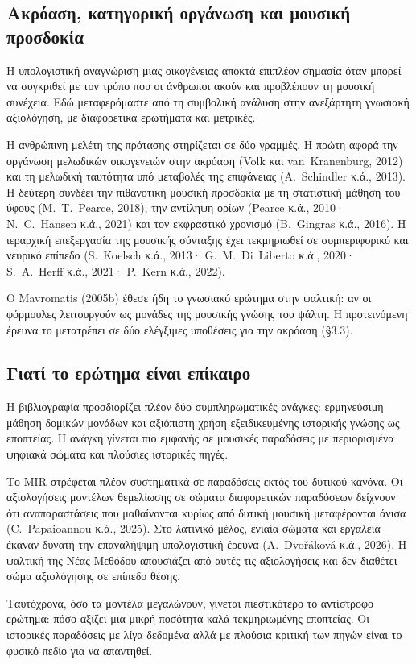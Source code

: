 \documentclass[11pt,a4paper]{article}
\begin{document}
\subsection{Ακρόαση, κατηγορική οργάνωση και μουσική προσδοκία}
Η υπολογιστική αναγνώριση μιας οικογένειας αποκτά επιπλέον σημασία όταν μπορεί να συγκριθεί με τον τρόπο που οι άνθρωποι ακούν και προβλέπουν τη μουσική συνέχεια. Εδώ μεταφερόμαστε από τη συμβολική ανάλυση στην ανεξάρτητη γνωσιακή αξιολόγηση, με διαφορετικά ερωτήματα και μετρικές.

Η ανθρώπινη μελέτη της πρότασης στηρίζεται σε δύο γραμμές. Η πρώτη αφορά την οργάνωση μελωδικών οικογενειών στην ακρόαση (Volk και van~Kranenburg, 2012) και τη μελωδική ταυτότητα υπό μεταβολές της επιφάνειας (A.~Schindler κ.ά., 2013). Η δεύτερη συνδέει την πιθανοτική μουσική προσδοκία με τη στατιστική μάθηση του ύφους (M.~T.~Pearce, 2018), την αντίληψη ορίων (Pearce κ.ά., 2010· N.~C.~Hansen κ.ά., 2021) και τον εκφραστικό χρονισμό (B.~Gingras κ.ά., 2016). Η ιεραρχική επεξεργασία της μουσικής σύνταξης έχει τεκμηριωθεί σε συμπεριφορικό και νευρικό επίπεδο (S.~Koelsch κ.ά., 2013· G.~M.~Di~Liberto κ.ά., 2020· S.~A.~Herff κ.ά., 2021· P.~Kern κ.ά., 2022).

Ο Mavromatis (2005b) έθεσε ήδη το γνωσιακό ερώτημα στην ψαλτική: αν οι φόρμουλες λειτουργούν ως μονάδες της μουσικής γνώσης του ψάλτη. Η προτεινόμενη έρευνα το μετατρέπει σε δύο ελέγξιμες υποθέσεις για την ακρόαση (§3.3).

\subsection{Γιατί το ερώτημα είναι επίκαιρο}
Η βιβλιογραφία προσδιορίζει πλέον δύο συμπληρωματικές ανάγκες: ερμηνεύσιμη μάθηση δομικών μονάδων και αξιόπιστη χρήση εξειδικευμένης ιστορικής γνώσης ως εποπτείας. Η ανάγκη γίνεται πιο εμφανής σε μουσικές παραδόσεις με περιορισμένα ψηφιακά σώματα και πλούσιες ιστορικές πηγές.

Το MIR στρέφεται πλέον συστηματικά σε παραδόσεις εκτός του δυτικού κανόνα. Οι αξιολογήσεις μοντέλων θεμελίωσης σε σώματα διαφορετικών παραδόσεων δείχνουν ότι αναπαραστάσεις που μαθαίνονται κυρίως από δυτική μουσική μεταφέρονται άνισα (C.~Papaioannou κ.ά., 2025). Στο λατινικό μέλος, ενιαία σώματα και εργαλεία έκαναν δυνατή την επαναλήψιμη υπολογιστική έρευνα (A.~Dvořáková κ.ά., 2026). Η ψαλτική της Νέας Μεθόδου απουσιάζει από αυτές τις αξιολογήσεις και δεν διαθέτει σώμα αξιολόγησης σε επίπεδο θέσης.

Ταυτόχρονα, όσο τα μοντέλα μεγαλώνουν, γίνεται πιεστικότερο το αντίστροφο ερώτημα: πόσο αξίζει μια μικρή ποσότητα καλά τεκμηριωμένης εποπτείας. Οι ιστορικές παραδόσεις με λίγα δεδομένα αλλά με πλούσια κριτική των πηγών είναι το φυσικό πεδίο για να απαντηθεί.
\end{document}
